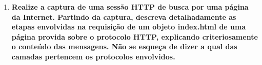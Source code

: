 \begin{enumerate}
  \item \textbf{Realize a captura de uma sessão HTTP de busca por uma página da Internet. Partindo da
    captura, descreva detalhadamente as etapas envolvidas na requisição de um objeto
    index.html de uma página provida sobre o protocolo HTTP, explicando criteriosamente o
    conteúdo das mensagens. Não se esqueça de dizer a qual das camadas pertencem os
    protocolos envolvidos.}

  
\end{enumerate}
